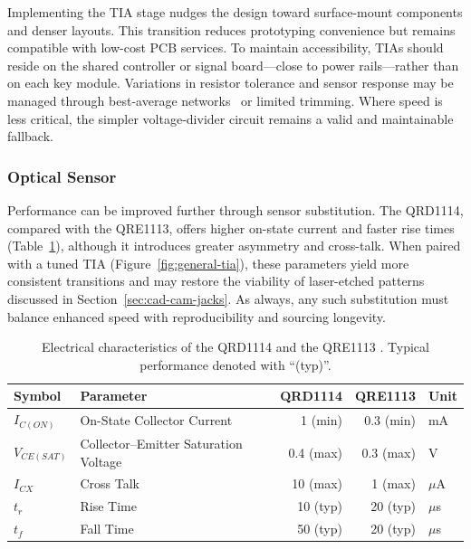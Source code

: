 Implementing the TIA stage nudges the design toward surface-mount components and denser layouts. This transition reduces prototyping convenience but remains compatible with low-cost PCB services. To maintain accessibility, TIAs should reside on the shared controller or signal board—close to power rails—rather than on each key module. Variations in resistor tolerance and sensor response may be managed through best-average networks~\cite{mcpherson_portable_2013} or limited trimming. Where speed is less critical, the simpler voltage-divider circuit remains a valid and maintainable fallback.

\subsubsection{Optical Sensor}

Performance can be improved further through sensor substitution. The QRD1114, compared with the QRE1113, offers higher on-state current and faster rise times (Table~\ref{tab:qre-vs-qrd}), although it introduces greater asymmetry and cross-talk. When paired with a tuned TIA (Figure~\ref{fig:general-tia}), these parameters yield more consistent transitions and may restore the viability of laser-etched patterns discussed in Section~\ref{sec:cad-cam-jacks}. As always, any such substitution must balance enhanced speed with reproducibility and sourcing longevity.

\begin{table}
    \centering
    \begin{tabular}{ l l r r l}
        \hline
        \textbf{Symbol} & \textbf{Parameter}                   & \textbf{QRD1114} & \textbf{QRE1113} & \textbf{Unit} \\ \hline
        $I_{C(ON)}$     & On-State Collector Current           & 1 (min)          & 0.3 (min)        & mA            \\
        $V_{CE(SAT)}$   & Collector--Emitter Saturation Voltage & 0.4 (max)        & 0.3 (max)        & V             \\
        $I_{CX}$        & Cross Talk                           & 10 (max)         & 1 (max)          & $\mu$A        \\
        $t_r$           & Rise Time                            & 10 (typ)         & 20 (typ)         & $\mu$s        \\
        $t_f$           & Fall Time                            & 50 (typ)         & 20 (typ)         & $\mu$s        \\ \hline
    \end{tabular}
    \caption[Electrical characteristics of the QRD1114 and the
        QRE1113]{Electrical characteristics of the QRD1114
        \cite{onsemiconductor_qrd1114_2024} and the QRE1113
        \cite{onsemiconductor_qre1113_2024}. Typical performance denoted with
        ``(typ)''.}
    \label{tab:qre-vs-qrd}
\end{table}

